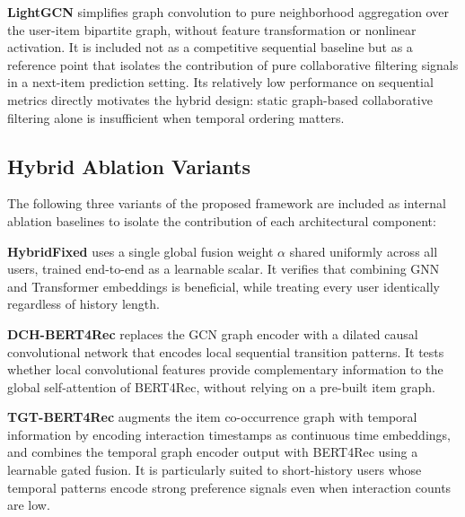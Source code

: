 \documentclass[12pt,a4paper]{report}
\begin{document}
\textbf{LightGCN} \citep{he2020lightgcn} simplifies graph convolution to pure
neighborhood aggregation over the user-item bipartite graph, without feature
transformation or nonlinear activation. It is included not as a competitive
sequential baseline but as a reference point that isolates the contribution of
pure collaborative filtering signals in a next-item prediction setting. Its
relatively low performance on sequential metrics directly motivates the hybrid
design: static graph-based collaborative filtering alone is insufficient when
temporal ordering matters.

\subsection*{Hybrid Ablation Variants}

The following three variants of the proposed framework are included as internal
ablation baselines to isolate the contribution of each architectural component:

\textbf{HybridFixed} uses a single global fusion weight \(\alpha\) shared
uniformly across all users, trained end-to-end as a learnable scalar. It
verifies that combining GNN and Transformer embeddings is beneficial, while
treating every user identically regardless of history length.

\textbf{DCH-BERT4Rec} replaces the GCN graph encoder with a dilated causal
convolutional network that encodes local sequential transition patterns. It
tests whether local convolutional features provide complementary information
to the global self-attention of BERT4Rec, without relying on a pre-built item
graph.

\textbf{TGT-BERT4Rec} augments the item co-occurrence graph with temporal
information by encoding interaction timestamps as continuous time embeddings,
and combines the temporal graph encoder output with BERT4Rec using a learnable
gated fusion. It is particularly suited to short-history users whose temporal
patterns encode strong preference signals even when interaction counts are low.
\end{document}
